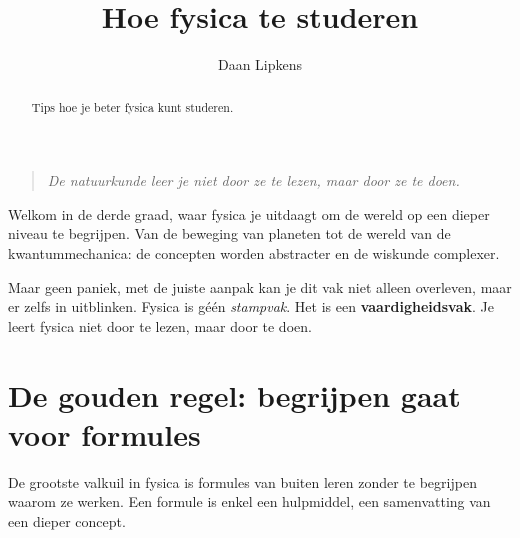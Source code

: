 \documentclass{ximera}
\title{Hoe fysica te studeren}
\author{Daan Lipkens}
\begin{document}
\begin{abstract}
    Tips hoe je beter fysica kunt studeren.
\end{abstract}
\maketitle

\begin{quote}
  \textit{De natuurkunde leer je niet door ze te lezen, maar door ze te doen.}
\end{quote}

Welkom in de derde graad, waar fysica je uitdaagt om de wereld op een dieper niveau te begrijpen.  
Van de beweging van planeten tot de wereld van de kwantummechanica: de concepten worden abstracter en de wiskunde complexer.  

Maar geen paniek, met de juiste aanpak kan je dit vak niet alleen overleven, maar er zelfs in uitblinken.  
Fysica is géén \textit{stampvak}. Het is een \textbf{vaardigheidsvak}.  
Je leert fysica niet door te lezen, maar door te doen.


\section*{De gouden regel: begrijpen gaat voor formules}


\begin{remark}[] %
De grootste valkuil in fysica is formules van buiten leren zonder te begrijpen waarom ze werken.  
Een formule is enkel een hulpmiddel, een samenvatting van een dieper concept.
\end{remark}
\end{document}
